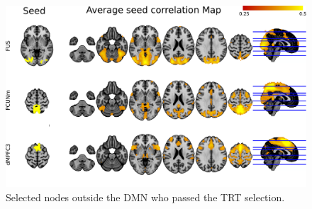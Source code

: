 \begin{figure}[H]
\begin{center}
\includegraphics[width=\linewidth]{../figures/fig_nodes_non_DMN.png}
\end{center}
\caption[Selected region outside DMN]{
	  Selected nodes outside the DMN who passed the TRT selection.
}
\label{fig_nodes_none_DMN}
\end{figure}

